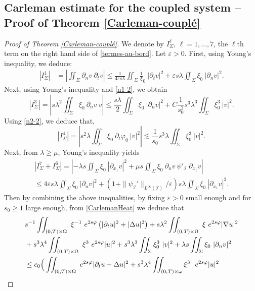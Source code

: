 \documentclass[a4paper, 12pt]{article}
\theoremstyle{plain}
\theoremstyle{definition}
\numberwithin{theorem}{section}
\numberwithin{equation}{section}
\begin{document}
{\subsection{Carleman estimate for the coupled system -- Proof of Theorem \ref{Carleman-couplé}}\label{Sect33}
\begin{proof}[Proof of Theorem \ref{Carleman-couplé}]
We denote by $I^\ell_\Sigma$, $\ell=1,\dots, 7$, the $\ell$th term on the right hand side of \eqref{termes-au-bord}. 
Let $\varepsilon>0$. First, using Young's inequality, we deduce:
\begin{align*}    |I^1_\Sigma|&=\left|\iint_\Sigma\partial_nv~\partial_tv\right|\leq \frac{1}{4\varepsilon s\lambda}\iint_\Sigma\frac1\xi_0~|\partial_tv|^2+\varepsilon s\lambda\iint_\Sigma\xi_0~|\partial_nv|^2.
\end{align*}
Next, using Young's inequality and  \eqref{n1-2}, we obtain
$$
|I^3_\Sigma|=\left|s\lambda^2\iint_\Sigma\xi_0~\partial_n v~v\right|\leq \frac{s\lambda}{2}\iint_\Sigma\xi_0~|\partial_nv|^2+C \frac{1}{s_0^2}s^3\lambda^3\iint_\Sigma\xi_0^3~|v|^2.
$$
Using \eqref{n2-2}, we deduce that,
$$
    |I^4_\Sigma|=\left| s^2\lambda\iint_\Sigma\xi_0~\partial_t\varphi_0~|v|^2\right|\lesssim  \frac{1}{s_0}s^3\lambda \iint_\Sigma\xi_0^3~|v|^2.
$$
Next, from $\lambda\geq \mu$, Young's inequality yields
\begin{multline*}
|I^7_\Sigma+I^6_\Sigma|=\left|-\lambda s\iint_\Sigma\xi_0~|\partial_{x_1} v|^2+\mu s\iint_\Sigma\xi_0~\partial_nv~\psi'_{\mathcal{I}}~\partial_{x_1}v\right|\\
\leq 4\varepsilon s\lambda \iint_\Sigma\xi_0~|\partial_nv|^2+(1+\|\psi_{\mathcal{I}}'\|_{L^\infty(\mathcal{I})}/\varepsilon) s\lambda \iint_\Sigma\xi_0~|\partial_{x_1}v|^2.
\end{multline*}
Then by combining the above inequalities, by fixing $\varepsilon>0$ small enough and for $s_0\geq 1$ large enough, from \eqref{CarlemanHeat} we deduce that 
\begin{align}\label{est7-03} 
& s^{-1}\iint_{(0,T)\times\Omega}~\xi^{-1}~e^{2s\varphi}\left(|\partial_tu|^2+|\Delta u|^2\right)+s\lambda^2\iint_{(0,T)\times\Omega}~\xi~e^{2s\varphi}|\nabla u|^2\notag\\ 
   &+s^3\lambda^4\iint_{(0,T)\times\Omega}~\xi^3~e^{2s\varphi}|u|^2+s^3\lambda^3\iint_\Sigma\xi_0^3~|v|^2+\lambda s\iint_\Sigma\xi_0~|\partial_n v|^2\\ &\leq c_0 
   \Big(\iint_{(0,T)\times\Omega}~e^{2s\varphi}|\partial_tu-\Delta u|^2+s^3\lambda^4\iint_{(0,T)\times\omega} \xi^3~~e^{2s\varphi}| u|^2\notag\\

\end{align}
\end{proof}}
\end{document}
